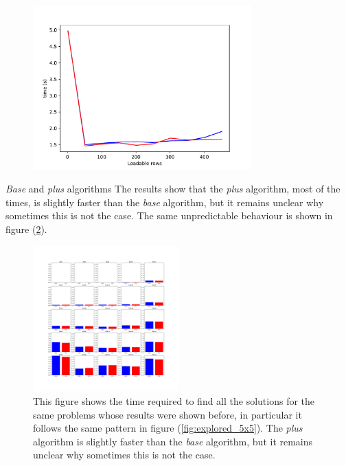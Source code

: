 \documentclass{beamer}
\begin{document}
\begin{frame}{}
    \begin{figure}
        \centering
        \includegraphics[width=0.75\textwidth]{loadable_rows_time_diff_shuffled.pdf}
        \label{fig:loadable_rows_time_diff_shuffled}
    \end{figure}
\end{frame}

\begin{frame}{\textit{Base} and \textit{plus} algorithms}
    The results show that the \textit{plus} algorithm, most of the times,
    is slightly faster than the \textit{base} algorithm, but it remains unclear
    why sometimes this is not the case.
    The same unpredictable behaviour is shown in figure (\ref{fig:base_star_5x5}).
\end{frame}

\begin{frame}{}
    \begin{figure}
        \centering
        \includegraphics[width=0.5\textwidth]{base_star_5x5.pdf}
        \caption{This figure shows the time required to find all the solutions for the same problems
        whose results were shown before, in particular it follows the same pattern in figure (\ref{fig:explored_5x5}).
        The \textit{plus} algorithm is slightly faster than the \textit{base} algorithm, but it remains unclear
        why sometimes this is not the case.}
        \label{fig:base_star_5x5}
    \end{figure}
\end{frame}
\end{document}
